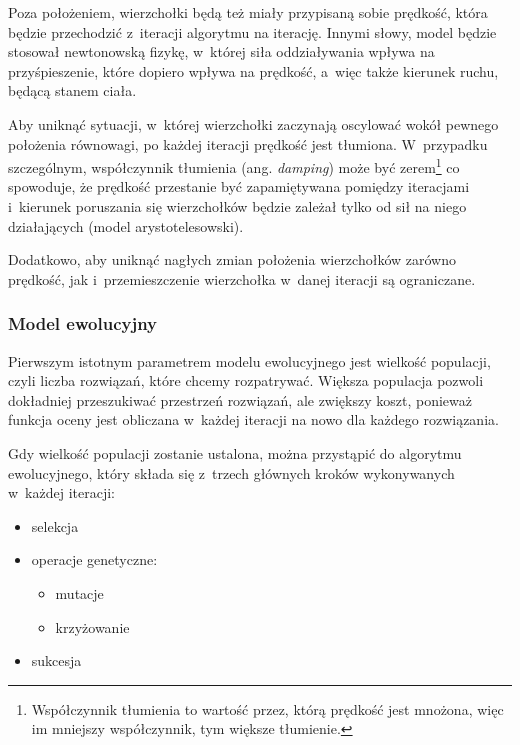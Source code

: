 \documentclass[a4paper,onecolumn,oneside,12pt]{mwart}
\begin{document}
Poza położeniem, wierzchołki będą też miały przypisaną sobie prędkość,
która będzie przechodzić z~iteracji algorytmu na iterację.  Innymi słowy,
model będzie stosował newtonowską fizykę, w~której siła oddziaływania
wpływa na przyśpieszenie, które dopiero wpływa na prędkość, a~więc także
kierunek ruchu, będącą stanem ciała.

Aby uniknąć sytuacji, w~której wierzchołki zaczynają oscylować wokół
pewnego położenia równowagi, po każdej iteracji prędkość jest tłumiona.
W~przypadku szczególnym, współczynnik tłumienia (ang. {\it damping}) może
być zerem\footnote{Współczynnik tłumienia to wartość przez, którą prędkość
  jest mnożona, więc im mniejszy współczynnik, tym większe tłumienie.} co
spowoduje, że prędkość przestanie być zapamiętywana pomiędzy iteracjami
i~kierunek poruszania się wierzchołków będzie zależał tylko od sił na niego
działających (model arystotelesowski).

Dodatkowo, aby uniknąć nagłych zmian położenia wierzchołków zarówno
prędkość, jak i~przemieszczenie wierzchołka w~danej iteracji są
ograniczane.

\subsubsection{Model ewolucyjny}

Pierwszym istotnym parametrem modelu ewolucyjnego jest wielkość populacji,
czyli liczba rozwiązań, które chcemy rozpatrywać. Większa populacja pozwoli
dokładniej przeszukiwać przestrzeń rozwiązań, ale zwiększy koszt, ponieważ
funkcja oceny jest obliczana w~każdej iteracji na nowo dla każdego
rozwiązania.

Gdy wielkość populacji zostanie ustalona, można przystąpić do algorytmu
ewolucyjnego, który składa się z~trzech głównych kroków wykonywanych
w~każdej iteracji:
\begin{itemize}
	\item selekcja
	\item operacje genetyczne:
		\begin{itemize}
			\item mutacje
			\item krzyżowanie
		\end{itemize}
	\item sukcesja
\end{itemize}
\end{document}
